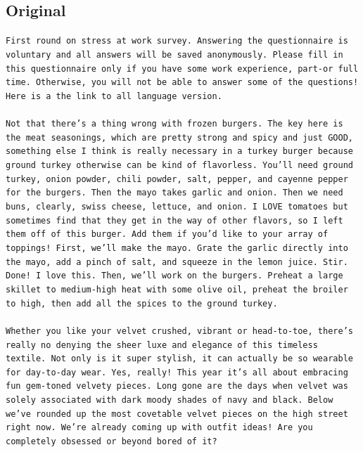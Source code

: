 \subsection*{Original}
\begin{tcolorbox}[colback=gray!20, colframe=gray!75, rounded corners, sharp corners=northeast, sharp corners=southwest]
\texttt{First round on stress at work survey. Answering the questionnaire is voluntary and all answers will be saved anonymously. Please fill in this questionnaire only if you have some work experience, part-or full time. Otherwise, you will not be able to answer some of the questions! Here is a the link to all language version.\\\\
Not that there's a thing wrong with frozen burgers. The key here is the meat seasonings, which are pretty strong and spicy and just GOOD, something else I think is really necessary in a turkey burger because ground turkey otherwise can be kind of flavorless. You'll need ground turkey, onion powder, chili powder, salt, pepper, and cayenne pepper for the burgers. Then the mayo takes garlic and onion. Then we need buns, clearly, swiss cheese, lettuce, and onion. I LOVE tomatoes but sometimes find that they get in the way of other flavors, so I left them off of this burger. Add them if you'd like to your array of toppings! First, we'll make the mayo. Grate the garlic directly into the mayo, add a pinch of salt, and squeeze in the lemon juice. Stir. Done! I love this. Then, we'll work on the burgers. Preheat a large skillet to medium-high heat with some olive oil, preheat the broiler to high, then add all the spices to the ground turkey.\\\\
Whether you like your velvet crushed, vibrant or head-to-toe, there's really no denying the sheer luxe and elegance of this timeless textile. Not only is it super stylish, it can actually be so wearable for day-to-day wear. Yes, really! This year it's all about embracing fun gem-toned velvety pieces. Long gone are the days when velvet was solely associated with dark moody shades of navy and black. Below we've rounded up the most covetable velvet pieces on the high street right now. We're already coming up with outfit ideas! Are you completely obsessed or beyond bored of it?\\\\
}
\end{tcolorbox}
